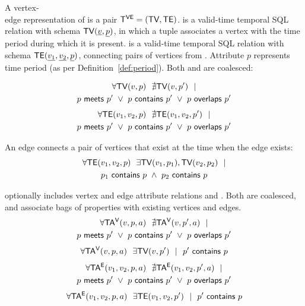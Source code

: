 \begin{definition}
A vertex-\\edge representation of \tg is a pair $\mathsf{T^{VE}}=(\textsf{TV}, \textsf{TE})$. \tv
is a valid-time temporal SQL relation with schema $\textsf{TV}(\underline{v},
\underline{p})$, in which a tuple associates a vertex with the time
period during which it is present. \te is a valid-time temporal SQL
relation with schema $\textsf{TE}(\underline{v_1}, \underline{v_2},
\underline{p})$, connecting pairs of vertices from \tv.  Attribute $p$
represents time period (as per Definition~\ref{def:period}).  Both \tv
and \te are coalesced:

\begin{multline}
\forall \textsf{TV}(v, p)~~\nexists \textsf{TV}(v, p')~~| \\
                       p~\mathsf{meets}~p'~\lor~p~\mathsf{contains}~p'~\lor~p~\mathsf{overlaps}~p'
\label{def:tg:c2}
\end{multline}
\vspace{-0.5cm}
\begin{multline}
\forall \textsf{TE}(v_1, v_2, p)~~\nexists \textsf{TE}(v_1,v_2, p')~~| \\
                       p~\mathsf{meets}~p'~\lor~p~\mathsf{contains}~p'~\lor~p~\mathsf{overlaps}~p'
\label{def:tg:c3}
\end{multline}

An edge connects a pair of vertices that exist at the time when the edge exists:
\begin{multline}
\forall \textsf{TE}(v_1, v_2, p)~~\exists \textsf{TV}(v_1, p_1), \textsf{TV}(v_2, p_2)~~| \\
                       p_1~\mathsf{contains}~p~\wedge~p_2~\mathsf{contains}~p
\label{def:tg:c1}
\end{multline}
\vspace{-0.5cm}

 optionally includes vertex and edge attribute relations \tav
and \tae.  Both are coalesced, and associate bags of properties with
existing vertices and edges.
\begin{multline}
\forall \mathsf{TA^{V}}(v, p, a)~~\nexists \mathsf{TA^{V}}(v, p', a)~~| \\
                       p~\mathsf{meets}~p'~\lor~p~\mathsf{contains}~p'~\lor~p~\mathsf{overlaps}~p'
\label{def:tg:c4}
\end{multline}
\begin{multline}
\forall \mathsf{TA^{V}}(v, p, a)~~\exists \textsf{TV}(v,p')~~|~~p'~\mathsf{contains}~p
\label{def:tg:c5}
\end{multline}
\begin{multline}
\forall \mathsf{TA^{E}}(v_1, v_2, p, a)~~\nexists \mathsf{TA^{E}}(v_1, v_2, p', a)~~| \\
                       p~\mathsf{meets}~p'~\lor~p~\mathsf{contains}~p'~\lor~p~\mathsf{overlaps}~p'
\label{def:tg:c6}
\end{multline}
\begin{multline}
\forall \mathsf{TA^{E}}(v_1, v_2, p, a)~~\exists \textsf{TE}(v_1,v_2,p')~~|~~p'~\mathsf{contains}~p
\label{def:tg:c7}
\end{multline}

\label{def:tg}
\end{definition}

